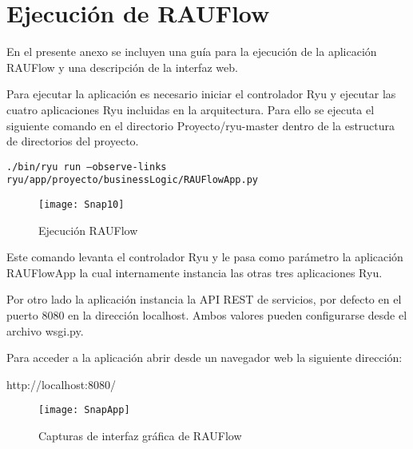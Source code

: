 
\chapter{Ejecuci\'on de RAUFlow}
\label{appendix5}

\ifpdf
    \graphicspath{{Appendix5/Figs/Raster/}{Appendix5/Figs/PDF/}{Appendix5/Figs/}}
\else
    \graphicspath{{Appendix5/Figs/Vector/}{Appendix5/Figs/}}
\fi

En el presente anexo se incluyen una guía para la ejecuci\'on de la aplicaci\'on RAUFlow y una descripción de la interfaz web.

Para ejecutar la aplicaci\'on es necesario iniciar el controlador Ryu y ejecutar las cuatro aplicaciones Ryu incluidas en la arquitectura. Para ello se ejecuta el siguiente comando en el directorio Proyecto/ryu-master dentro de la estructura de directorios del proyecto.

\begin{center}
\texttt{./bin/ryu run --observe-links ryu/app/proyecto/businessLogic/RAUFlowApp.py}
\end{center}

\begin{figure}[h] 
\centering    
\texttt{[image: Snap10]}
\caption[Ejecuci\'on RAUFlow]{Ejecuci\'on RAUFlow}
\label{fig:Img2}
\end{figure}

Este comando levanta el controlador Ryu y le pasa como parámetro la aplicaci\'on RAUFlowApp la cual internamente instancia las otras tres aplicaciones Ryu.

Por otro lado la aplicaci\'on instancia la API REST de servicios, por defecto en el puerto 8080 en la direcci\'on localhost. Ambos valores pueden configurarse desde el archivo wsgi.py.

Para acceder a la aplicaci\'on abrir desde un navegador web la siguiente direcci\'on:

\begin{center}
http://localhost:8080/
\end{center}


\begin{figure}[ht!] 
\centering    
\texttt{[image: SnapApp]}
\caption[Capturas de interfaz gráfica de RAUFlow]{Capturas de interfaz gráfica de RAUFlow}
\label{fig:Img2}
\end{figure}